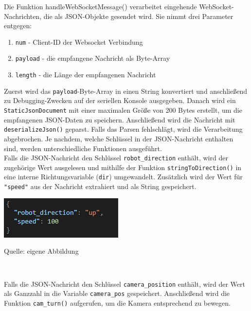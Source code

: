 \documentclass[ngerman,12pt,a4paper]{article}
\begin{document}
	Die Funktion handleWebSocketMessage() verarbeitet eingehende WebSocket-Nachrichten, die als JSON-Objekte gesendet wird. Sie nimmt drei Parameter entgegen:
	\begin{enumerate}
		\item \texttt{num} - Client-ID der Websocket Verbindung
		\item \texttt{payload} - die empfangene Nachricht als Byte-Array
		\item \texttt{length} - die Länge der empfangenen Nachricht
	\end{enumerate}
	Zuerst wird das \texttt{payload}-Byte-Array in einen String konvertiert und anschließend zu Debugging-Zwecken auf der seriellen Konsole ausgegeben. Danach wird ein \texttt{StaticJsonDocument} mit einer maximalen Größe von 200 Bytes erstellt, um die empfangenen JSON-Daten zu speichern. Anschließend wird die Nachricht mit \texttt{deserializeJson()} geparst. Falls das Parsen fehlschlägt, wird die Verarbeitung abgebrochen. Je nachdem, welche Schlüssel in der JSON-Nachricht enthalten sind, werden unterschiedliche Funktionen ausgeführt. \\[0.3cm]
	Falls die JSON-Nachricht den Schlüssel \texttt{robot\_direction} enthält, wird der zugehörige Wert ausgelesen und mithilfe der Funktion \texttt{stringToDirection()} in eine interne Richtungsvariable (\texttt{dir}) umgewandelt. Zusätzlich wird der Wert für \texttt{"speed"} aus der Nachricht extrahiert und als String gespeichert. 
	\begin{center}
		\begin{minipage}[t]{0.4\textwidth}
			\includegraphics{Pictures/example-navigate}
			\label{fig:example-speed}
			\vspace{-10pt}
			\begin{center}
				\par\small Quelle: eigene Abbildung 
			\end{center}
		\end{minipage} \\[0.3cm]
	\end{center}
	Falls die JSON-Nachricht den Schlüssel \texttt{camera\_position} enthält, wird der Wert als Ganzzahl in die Variable \texttt{camera\_pos} gespeichert. Anschließend wird die Funktion \texttt{cam\_turn()}  aufgerufen, um die Kamera entsprechend zu bewegen. 
\end{document}
